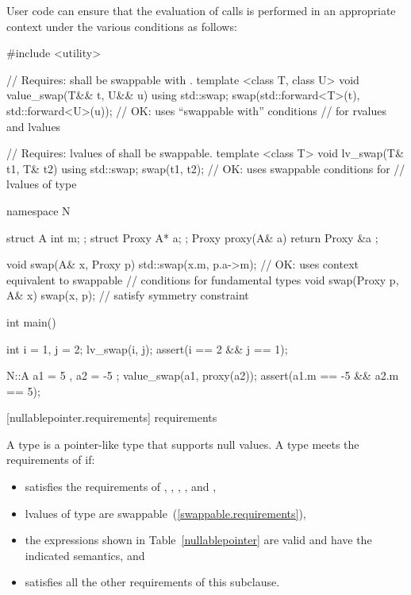 \enterexample User code can ensure that the evaluation of  calls
is performed in an appropriate context under the various conditions as follows:
\begin{codeblock}
#include <utility>

// Requires:  shall be swappable with .
template <class T, class U>
void value_swap(T&& t, U&& u) {
  using std::swap;
  swap(std::forward<T>(t), std::forward<U>(u)); // OK: uses ``swappable with'' conditions
                                                // for rvalues and lvalues
}

// Requires: lvalues of  shall be swappable.
template <class T>
void lv_swap(T& t1, T& t2) {
  using std::swap;
  swap(t1, t2);                                 // OK: uses swappable conditions for
}                                               // lvalues of type 

namespace N {
  struct A { int m; };
  struct Proxy { A* a; };
  Proxy proxy(A& a) { return Proxy{ &a }; }

  void swap(A& x, Proxy p) {
    std::swap(x.m, p.a->m);                     // OK: uses context equivalent to swappable
                                                // conditions for fundamental types
  }
  void swap(Proxy p, A& x) { swap(x, p); }      // satisfy symmetry constraint
}

int main() {
  int i = 1, j = 2;
  lv_swap(i, j);
  assert(i == 2 && j == 1);

  N::A a1 = { 5 }, a2 = { -5 };
  value_swap(a1, proxy(a2));
  assert(a1.m == -5 && a2.m == 5);
}
\end{codeblock}
\exitexample

[nullablepointer.requirements]{ requirements}

\pnum
A  type is a pointer-like type that supports null values.
A type  meets the requirements of  if:

\begin{itemize}
\item {} satisfies the requirements of ,
, , ,
and ,

\item lvalues of type  are swappable~(\ref{swappable.requirements}),

\item the expressions shown in Table~\ref{nullablepointer} are
valid and have the indicated semantics, and

\item {} satisfies all the other requirements of this subclause.
\end{itemize}

